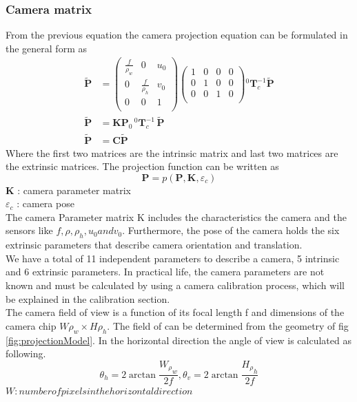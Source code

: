 \documentclass[journal,final,a4paper,twoside]{PS}
\begin{document}
\subsubsection{Camera matrix}
From the previous equation the camera projection equation can be formulated in the general form as
\begin{subequations}\begin{align}
\tilde{\textbf{P}}&= \begin{pmatrix}
\frac{f}{\rho_w}&0&u_0\\
0&\frac{f}{\rho_h}&v_0\\
0&0&1\\
\end{pmatrix}\begin{pmatrix}
1&0&0&0\\
0&1&0&0\\
0&0&1&0\\
\end{pmatrix}{}^{0}\textbf{T}_c^{-1}\tilde{\textbf{P}}\\
\tilde{\textbf{P}}&= \textbf{K}\textbf{P}_0 \,{}^{0}\textbf{T}^{-1}_c\,\tilde{\textbf{P}}\\
\tilde{\textbf{P}}&= \textbf{C}\tilde{\textbf{P}}
\end{align}
\end{subequations}
Where the first two matrices are the intrinsic matrix and last two matrices are the extrinsic matrices.
The projection function can be written as\cite{Corke}
\begin{equation}
\textbf{P}=p(\textbf{P},\textbf{K},\varepsilon_c)
\end{equation}
$\textbf{K}$ : camera parameter matrix
\\
$\varepsilon_c$ : camera pose\\
The camera Parameter matrix K includes the characteristics the camera and the sensors like $f,\rho,\rho_h,u_0  and v_0$. Furthermore, the pose of the camera holds the six extrinsic parameters that describe camera orientation and translation.
\\
We have a total of 11 independent parameters to describe a camera, 5 intrinsic and 6 extrinsic parameters. In practical life, the camera parameters are not known and must be calculated by using a camera calibration process, which will be explained in the calibration section.
\\
The camera field of view is a function of its focal length f  and dimensions of the camera chip $W\rho_w  \times  H\rho_h$. The field of can be determined from the geometry of fig \ref{fig:projectionModel}.
In the horizontal direction the angle of view is calculated as following.
\begin{equation}
\theta_h = 2\arctan{\frac{{W_\rho}_w}{2f}}, \theta_v = 2\arctan{\frac{{H_\rho}_h}{2f}}
\end{equation}
$W: number of pixels in the horizontal direction$
\end{document}
